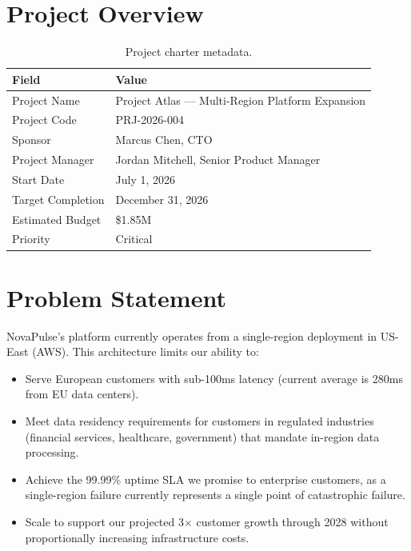 \documentclass[
    language=english,
    doctype=project-charter,
    institution=none,
]{../../omnilatex}
\begin{document}
\maketitle

\section*{Project Overview}

\begin{table}[h]
    \centering
    \begin{tabular}{ll}
        \toprule
        \textbf{Field} & \textbf{Value} \\
        \midrule
        Project Name        & Project Atlas --- Multi-Region Platform Expansion \\
        Project Code        & PRJ-2026-004 \\
        Sponsor             & Marcus Chen, CTO \\
        Project Manager     & Jordan Mitchell, Senior Product Manager \\
        Start Date          & July 1, 2026 \\
        Target Completion   & December 31, 2026 \\
        Estimated Budget    & \$1.85M \\
        Priority            & Critical \\
        \bottomrule
    \end{tabular}
    \caption{Project charter metadata.}
\end{table}

\section{Problem Statement}

NovaPulse's platform currently operates from a single-region deployment in
US-East (AWS). This architecture limits our ability to:

\begin{itemize}
    \item Serve European customers with sub-100ms latency (current average
          is 280ms from EU data centers).
    \item Meet data residency requirements for customers in regulated
          industries (financial services, healthcare, government) that
          mandate in-region data processing.
    \item Achieve the 99.99\% uptime SLA we promise to enterprise customers,
          as a single-region failure currently represents a single point
          of catastrophic failure.
    \item Scale to support our projected 3$\times$ customer growth through
          2028 without proportionally increasing infrastructure costs.
\end{itemize}
\end{document}
